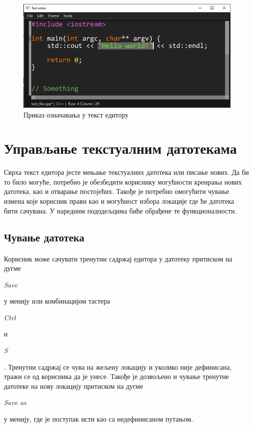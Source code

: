 \documentclass[12pt,oneside]{memoir}
\begin{document}
\begin{figure}[!ht]
	\centering
	\includegraphics[width=1.0\textwidth]{images/selection.png}
	\caption{Приказ означавања у текст едитору}
	\label{fig:selection}
\end{figure}

\section{Управљање текстуалним датотекама}
\paragraph{}
Сврха текст едитора јесте мењање текстуалних датотека или писање нових. 
Да би то било могуће, потребно је обезбедити кориснику могућности креирања нових датотека,
као и отварање постојећих. Такође је потребно омогућити чување измена које корисник
прави као и могућност избора локације где ће датотека бити сачувана.  У наредним
пододељцима биће обрађене те функционалности. 

\subsection{Чување датотека}
\paragraph{}
Корисник може сачувати тренутни садржај едитора у датотеку притиском на дугме 
\begin{latinica}\textit{Save}\end{latinica} у менију или комбинацијом
тастера \begin{latinica}\textit{Ctrl}\end{latinica} и
\begin{latinica}\textit{S}\end{latinica}. Тренутни садржај се чува на 
жељену локацију и уколико није дефинисана, тражи се од корисника
да је унесе. Такође је дозвољено и чување тренутне датотеке на нову локацију
притиском на дугме \begin{latinica}\textit{Save as}\end{latinica} у менију, где
је поступак исти као са недефинисаном путањом.
\end{document}
